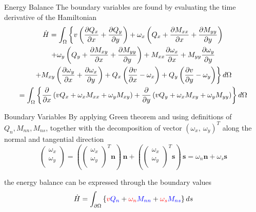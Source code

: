 \documentclass{beamer}
\begin{document}
\begin{frame}{Energy Balance}
The boundary variables are found by evaluating the time derivative of the Hamiltonian
\begin{multline*}
\dot{H} = \int_\Omega\left\{v \left(\diffp{Q_x}{x} + \diffp{Q_y}{y}\right) + \omega_x \left(Q_x + \diffp{M_{xx}}{x} + \diffp{M_{yy}}{y} \right) \right. \\
\left.  + \omega_y \left(Q_y + \diffp{M_{xy}}{x} + \diffp{M_{yy}}{y} \right)  + M_{xx} \diffp{\omega_x}{x} + M_{yy} \diffp{\omega_y}{y} \right. \\
\left. + M_{xy} \left(\diffp{\omega_y}{x} + \diffp{\omega_x}{y} \right) + Q_x \left(\diffp{v}{x} -\omega_x \right) + Q_y \left(\diffp{v}{y} -\omega_y \right)  \right\} d\Omega  \\
= \int_\Omega \left\{\diffp{}{x}\left(v Q_x + \omega_x M_{xx} + \omega_y M_{xy} \right) + \diffp{}{y}\left(v Q_y + \omega_x M_{xy} + \omega_y M_{yy} \right)  \right\} d\Omega
\end{multline*}
\end{frame}

\begin{frame}{Boundary Variables}
By applying Green theorem and using definitions of $Q_n, M_{nn}, M_{ns}$, together with the decomposition of vector $(\omega_x,\ \omega_y)^T$ along the normal and tangential direction
\begin{equation*} 
\begin{pmatrix}
\omega_x \\
\omega_y \\
\end{pmatrix}
= \left(\begin{pmatrix}
\omega_x \\
\omega_y \\
\end{pmatrix}^T \bm{n} \right) \,\bm{n} + 
\left(\begin{pmatrix}
\omega_x \\
\omega_y \\
\end{pmatrix}^T \bm{s}\right) \, \bm{s} = \omega_n \bm{n} +   \omega_s \bm{s}
\end{equation*}

the energy balance can be expressed through the boundary values
\begin{equation*}
\label{eq:energyBal_Min}
\dot{H} = \int_{\partial \Omega} \left\{\textcolor{red}{v} \textcolor{blue}{Q_n} + \textcolor{red}{\omega_n} \textcolor{blue}{M_{nn}} + \textcolor{red}{\omega_s} \textcolor{blue}{M_{ns}}  \right\} ds
\end{equation*}
\end{frame}
\end{document}
